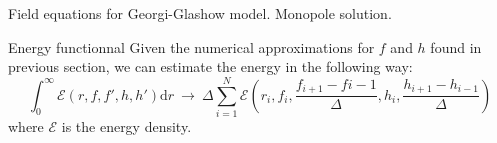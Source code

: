 \begin{section}{Field equations for Georgi-Glashow model. Monopole solution.}
\begin{subsection}{Energy functionnal}
  Given the numerical approximations for $f$ and $h$ found in previous
  section, we can estimate the energy in the following way:
  \begin{equation}
    \int_0^\infty \mathcal{E}(r, f, f', h, h')\mathrm d r \ \to\ \Delta\sum_{i = 1}^N \mathcal{E}\left(r_i, f_i, \frac{f_{i+1}-f{i-1}}{\Delta}, h_i, \frac{h_{i+1}-h_{i-1}}{\Delta}\right)
  \end{equation}
  where $\mathcal{E}$ is the energy density.
\end{subsection}

\end{section}
